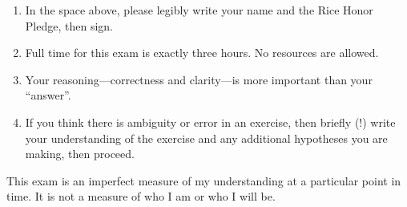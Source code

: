 \begin{enumerate}
\item In the space above, please legibly write your name and the Rice Honor Pledge, then sign.
\item Full time for this exam is exactly three hours. No resources are allowed.
\item Your reasoning---correctness and clarity---is more important than your ``answer''.
\item If you think there is ambiguity or error in an exercise, then briefly (!) write your understanding of the exercise and any additional hypotheses you are making, then proceed.
\end{enumerate}
This exam is an imperfect measure of my understanding at a particular point in time. It is not a measure of who I am or who I will be.